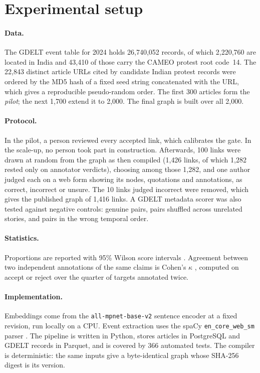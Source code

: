 \documentclass[pdflatex,sn-basic,lineno]{sn-jnl}
\theoremstyle{thmstylethree}
\theoremstyle{thmstyleone}
\begin{document}
\section{Experimental setup}\label{sec:setup}

\paragraph{Data.} The GDELT event table for 2024 holds 26{,}740{,}052 records, of which
2{,}220{,}760 are located in India and 43{,}410 of those carry the CAMEO protest root code~14. The
22{,}843 distinct article URLs cited by candidate Indian protest records were ordered by the MD5
hash of a fixed seed string concatenated with the URL, which gives a reproducible pseudo-random
order. The first 300 articles form the \emph{pilot}; the next 1{,}700 extend it to 2{,}000. The
final graph is built over all 2{,}000.

\paragraph{Protocol.} In the pilot, a person reviewed every accepted link, which calibrates the
gate. In the scale-up, no person took part in construction. Afterwards, 100 links were drawn at
random from the graph as then compiled (1{,}426 links, of which 1{,}282 rested only on annotator
verdicts), choosing among those 1{,}282, and one
author judged each on a web form showing its nodes, quotations and annotations, as correct,
incorrect or unsure. The 10 links judged incorrect were removed, which gives the published graph
of 1{,}416 links. A GDELT metadata scorer was also tested against negative controls: genuine pairs,
pairs shuffled across unrelated stories, and pairs in the wrong temporal order.

\paragraph{Statistics.} Proportions are reported with 95\% Wilson score intervals \citep{wilson}.
Agreement between two independent annotations of the same claims is Cohen's $\kappa$
\citep{cohen}, computed on accept or reject over the quarter of targets annotated twice.

\paragraph{Implementation.} Embeddings come from the \texttt{all-mpnet-base-v2} sentence encoder
\citep{sbert} at a fixed revision, run locally on a CPU. Event extraction uses the spaCy
\texttt{en\_core\_web\_sm} parser \citep{spacy}. The pipeline is written in Python, stores articles
in PostgreSQL and GDELT records in Parquet, and is covered by 366 automated tests. The compiler is
deterministic: the same inputs give a byte-identical graph whose SHA-256 digest is its version.
\end{document}
